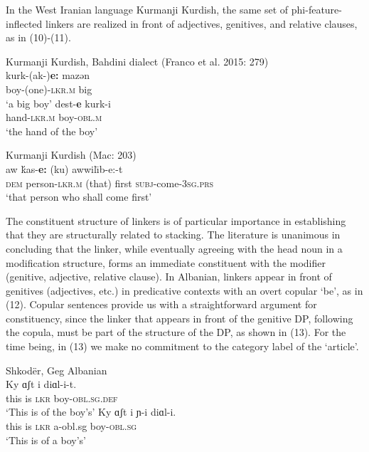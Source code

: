 \documentclass[output=paper]{langsci/langscibook}
\begin{document}
In the West Iranian language Kurmanji Kurdish, the same set of phi-feature-inflected linkers are realized in front of adjectives, genitives, and relative clauses, as in (10)-(11).  

\ea%
    Kurmanji Kurdish, Bahdini dialect (Franco et al. 2015: 279)\label{ex:manzini:10}\\
    \ea
    \gll kurk-(ak-)\textbf{e:}     mazən    \\
         boy-(one){}-\textsc{lkr.m}    big\\
    \glt ‘a big boy’
    \ex  
    \gll dest-\textbf{e}     kurk-i\\
         hand{}-\textsc{lkr.m}    boy{}-\textsc{obl.m} \\
    \glt ‘the hand of the boy’
    \z
\z         

\ea%
    Kurmanji Kurdish (Mac\citealt{Kenzie1961}: 203)\label{ex:manzini:11}\\
    \gll aw   ḱas-\textbf{e:}     (ku)   awwil\=\i   b-e:-t\\
         \textsc{dem}   person{}-\textsc{lkr.m}   (that)   first     \textsc{subj}{}-come-\textsc{3sg.prs}\\
    \glt ‘that person who shall come first’
\z

 The constituent structure of linkers is of particular importance in establishing that they are structurally related to stacking. The literature is unanimous in concluding that the linker, while eventually agreeing with the head noun in a modification structure, forms an immediate constituent with the modifier (genitive, adjective, relative clause). In Albanian, linkers appear in front of genitives (adjectives, etc.) in predicative contexts with an overt copular ‘be’, as in (12). Copular sentences provide us with a straightforward argument for constituency, since the linker that appears in front of the genitive DP, following the copula, must be part of the structure of the DP, as shown in (13). For the time being, in (13) we make no commitment to the category label of the ‘article’.

\ea%
    Shkodër, Geg Albanian\label{ex:manzini:12}\\
    \ea
    \gll Ky   ɑʃt   i   diɑl-i-t.     \\
         this  is  \textsc{lkr}  boy-\textsc{obl.sg.def}   \\
    \glt ‘This is of the boy’s’  
    \ex
    \gll Ky   ɑʃt   i  ɲ{}-i    diɑl-i.\\
         this  is  \textsc{lkr}  a-obl.sg   boy-\textsc{obl.sg}   \\
    \glt ‘This is of a boy’s’
    \z
\z
          
\end{document}
